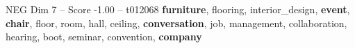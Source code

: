 \begin{textsample}{NEG Dim 7 – Score -1.00 – t012068}  \label{ex:f7_neg_038}
\textbf{furniture}, flooring, interior\_design, \textbf{event}, \textbf{chair}, floor, room, hall, ceiling, \textbf{conversation}, job, management, collaboration, hearing, boot, seminar, convention, \textbf{company}

\end{textsample}

